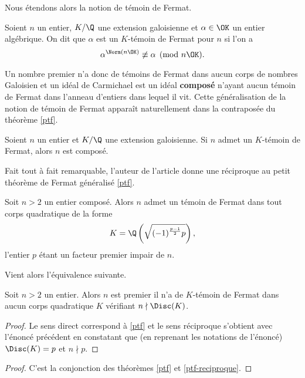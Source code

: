 Nous étendons alors la notion de témoin de Fermat.

\begin{definition}
	Soient $n$ un entier, $K/\Q$ une extension galoisienne et $\alpha\in \OK$ un entier algébrique. On dit que $\alpha$ est un $K$-témoin de Fermat pour $n$ si l'on a \[\alpha^{\Norm(n\OK)} \not \equiv \alpha \pmod{n\OK}.\]
\end{definition}

Un nombre premier n'a donc de témoins de Fermat dans aucun corps de nombres Galoisien et un idéal de Carmichael est un idéal \textbf{composé} n'ayant aucun témoin de Fermat dans l'anneau d'entiers dans lequel il vit. Cette généralisation de la notion de témoin de Fermat apparaît naturellement dans la contraposée du théorème \ref{ptf}.

\begin{theoreme}\label{ptf-contraposee}
	Soient $n$ un entier et $K/\Q$ une extension galoisienne. Si $n$ admet un $K$-témoin de Fermat, alors $n$ est composé.
\end{theoreme}

Fait tout à fait remarquable, l'auteur de l'article donne une réciproque au petit théorème de Fermat généralisé \ref{ptf}.

\begin{theoreme}
	Soit $n>2$ un entier composé. Alors $n$ admet un témoin de Fermat dans tout corps quadratique de la forme \[K = \Q\left(\sqrt{(-1)^{\frac{p-1}{2}}p}\right),\] l'entier $p$ étant un facteur premier impair de $n$.
\end{theoreme}

Vient alors l'équivalence suivante.

\begin{theoreme}\label{ptf-reciproque}
	Soit $n>2$ un entier. Alors $n$ est premier \ssi il n'a de $K$-témoin de Fermat dans aucun corps quadratique $K$ vérifiant $n\nmid \Disc(K)$.
\end{theoreme}

\begin{proof}
	Le sens direct correspond à \ref{ptf} et le sens réciproque s'obtient avec l'énoncé précédent en constatant que (en reprenant les notations de l'énoncé) $\Disc(K) = p$ et $n\nmid p$.
\end{proof}

\begin{proof}
	C'est la conjonction des théorèmes \ref{ptf} et \ref{ptf-reciproque}.
\end{proof}

